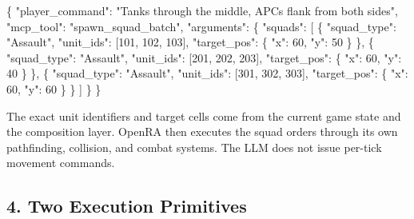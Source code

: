 \documentclass[
  journal]{IEEEtran}
\newenvironment{Shaded}{}{}
\newcommand{\DataTypeTok}[1]{\textcolor[rgb]{0.56,0.13,0.00}{#1}}
\newcommand{\DecValTok}[1]{\textcolor[rgb]{0.25,0.63,0.44}{#1}}
\newcommand{\FunctionTok}[1]{\textcolor[rgb]{0.02,0.16,0.49}{#1}}
\newcommand{\OtherTok}[1]{\textcolor[rgb]{0.00,0.44,0.13}{#1}}
\newcommand{\StringTok}[1]{\textcolor[rgb]{0.25,0.44,0.63}{#1}}
\begin{document}
\begin{Shaded}
\begin{Highlighting}[]
\FunctionTok{\{}
  \DataTypeTok{"player\_command"}\FunctionTok{:} \StringTok{"Tanks through the middle, APCs flank from both sides"}\FunctionTok{,}
  \DataTypeTok{"mcp\_tool"}\FunctionTok{:} \StringTok{"spawn\_squad\_batch"}\FunctionTok{,}
  \DataTypeTok{"arguments"}\FunctionTok{:} \FunctionTok{\{}
    \DataTypeTok{"squads"}\FunctionTok{:} \OtherTok{[}
      \FunctionTok{\{}
        \DataTypeTok{"squad\_type"}\FunctionTok{:} \StringTok{"Assault"}\FunctionTok{,}
        \DataTypeTok{"unit\_ids"}\FunctionTok{:} \OtherTok{[}\DecValTok{101}\OtherTok{,} \DecValTok{102}\OtherTok{,} \DecValTok{103}\OtherTok{]}\FunctionTok{,}
        \DataTypeTok{"target\_pos"}\FunctionTok{:} \FunctionTok{\{} \DataTypeTok{"x"}\FunctionTok{:} \DecValTok{60}\FunctionTok{,} \DataTypeTok{"y"}\FunctionTok{:} \DecValTok{50} \FunctionTok{\}}
      \FunctionTok{\}}\OtherTok{,}
      \FunctionTok{\{}
        \DataTypeTok{"squad\_type"}\FunctionTok{:} \StringTok{"Assault"}\FunctionTok{,}
        \DataTypeTok{"unit\_ids"}\FunctionTok{:} \OtherTok{[}\DecValTok{201}\OtherTok{,} \DecValTok{202}\OtherTok{,} \DecValTok{203}\OtherTok{]}\FunctionTok{,}
        \DataTypeTok{"target\_pos"}\FunctionTok{:} \FunctionTok{\{} \DataTypeTok{"x"}\FunctionTok{:} \DecValTok{60}\FunctionTok{,} \DataTypeTok{"y"}\FunctionTok{:} \DecValTok{40} \FunctionTok{\}}
      \FunctionTok{\}}\OtherTok{,}
      \FunctionTok{\{}
        \DataTypeTok{"squad\_type"}\FunctionTok{:} \StringTok{"Assault"}\FunctionTok{,}
        \DataTypeTok{"unit\_ids"}\FunctionTok{:} \OtherTok{[}\DecValTok{301}\OtherTok{,} \DecValTok{302}\OtherTok{,} \DecValTok{303}\OtherTok{]}\FunctionTok{,}
        \DataTypeTok{"target\_pos"}\FunctionTok{:} \FunctionTok{\{} \DataTypeTok{"x"}\FunctionTok{:} \DecValTok{60}\FunctionTok{,} \DataTypeTok{"y"}\FunctionTok{:} \DecValTok{60} \FunctionTok{\}}
      \FunctionTok{\}}
    \OtherTok{]}
  \FunctionTok{\}}
\FunctionTok{\}}
\end{Highlighting}
\end{Shaded}

The exact unit identifiers and target cells come from the current game
state and the composition layer. OpenRA then executes the squad orders
through its own pathfinding, collision, and combat systems. The LLM does
not issue per-tick movement commands.

\subsection{4. Two Execution Primitives}\label{two-execution-primitives}
\end{document}
